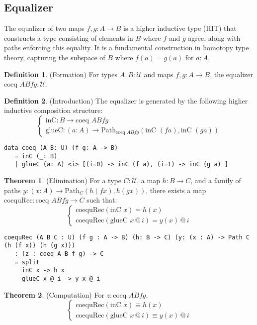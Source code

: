 \documentclass{article}
\theoremstyle{definition}
\newtheorem{theorem}{Theorem}
\newtheorem{definition}{Definition}
\begin{document}
\newpage

\subsection{Equalizer}
The equalizer of two maps $f, g : A \to B$ is a higher inductive type (HIT) that constructs a type consisting of elements in $B$ where $f$ and $g$ agree, along with paths enforcing this equality. It is a fundamental construction in homotopy type theory, capturing the subspace of $B$ where $f(a) = g(a)$ for $a : A$.

\begin{definition} (Formation)
For types $A, B : \mathcal{U}$ and maps $f, g : A \to B$, the equalizer $\text{coeq } A B f g : \mathcal{U}$.
\end{definition}

\begin{definition} (Introduction)
The equalizer is generated by the following higher inductive composition structure:
\[
\begin{cases}
\text{inC} : B \to \text{coeq } A B f g \\
\text{glueC} : (a : A) \to \text{Path}_{\text{coeq } A B f g} (\text{inC } (f a), \text{inC } (g a))
\end{cases}
\]
\begin{lstlisting}
data coeq (A B: U) (f g: A -> B)
   = inC (_: B)
   | glueC (a: A) <i> [(i=0) -> inC (f a), (i=1) -> inC (g a) ]
\end{lstlisting}
\end{definition}

\begin{theorem} (Elimination)
For a type $C : \mathcal{U}$, a map $h : B \to C$, and a family of paths $y : (x : A) \to \text{Path}_C (h (f x), h (g x))$, there exists a map $\text{coequRec} : \text{coeq } A B f g \to C$ such that:
\[
\begin{cases}
\text{coequRec}(\text{inC } x) = h(x) \\
\text{coequRec}(\text{glueC } x \, @ \, i) = y(x) \, @ \, i
\end{cases}
\]
\begin{lstlisting}
coequRec (A B C : U) (f g : A -> B) (h: B -> C) (y: (x : A) -> Path C (h (f x)) (h (g x)))
   : (z : coeq A B f g) -> C
   = split
     inC x -> h x
     glueC x @ i -> y x @ i
\end{lstlisting}
\end{theorem}

\begin{theorem} (Computation)
For $z : \text{coeq } A B f g$,
\[
\begin{cases}
\text{coequRec}(\text{inC } x) \equiv h(x) \\
\text{coequRec}(\text{glueC } x \, @ \, i) \equiv y(x) \, @ \, i
\end{cases}
\]
\end{theorem}
\end{document}
